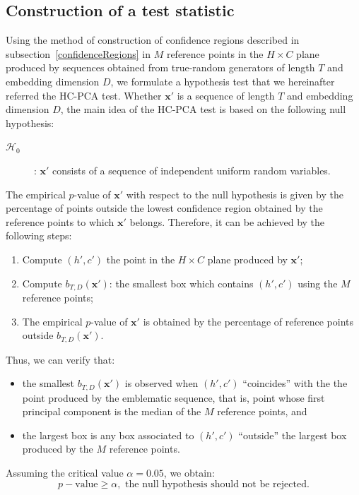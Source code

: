 \subsection{Construction of a test statistic}\label{test}

Using the method of construction of confidence regions described in subsection~\ref{confidenceRegions} in $M$ reference points in the $H \times C$ plane produced by sequences obtained from true-random generators of length $T$ and embedding dimension $D$, we formulate a hypothesis test that we hereinafter referred the HC-PCA test.
Whether $\bm x'$ is a sequence of length $T$ and embedding dimension $D$, the  main idea of the HC-PCA test is based on the following null hypothesis:
\begin{description}
    \item[$\mathcal{H}_0$]: $\bm x'$ consists of a sequence of independent uniform random variables.
\end{description}
The empirical $p$-value of $\bm x'$ with respect to the null hypothesis is given by the percentage of points outside the lowest confidence region obtained by the reference points to which $\bm x'$ belongs.
Therefore, it can be achieved by the following steps:
\begin{enumerate}
    \item Compute $(h',c')$ the point in the $H\times C$ plane produced by $\bm x'$;
    \item Compute $b_{T,D}(\bm x')$: the smallest box which contains $(h',c')$ using the $M$ reference points;
    \item The empirical $p$-value of $\bm x'$ is obtained by the percentage of reference points outside $b_{T,D}(\bm x')$.
\end{enumerate}
Thus, we can verify that:
\begin{itemize}
    \item the smallest $b_{T,D}(\bm x')$ is observed when $(h',c')$ ``coincides'' with the the point produced by the emblematic sequence, that is, point whose first principal component is the median of the $M$ reference points, and
    \item the largest box is any box associated to $(h',c')$ ``outside'' the largest box produced by the $M$ reference points.
\end{itemize}
Assuming the critical value $\alpha = 0.05$, we obtain:
\begin{equation*}
    p-\text{value} \geq \alpha, \text{ the null hypothesis should not be rejected}.
\end{equation*}
